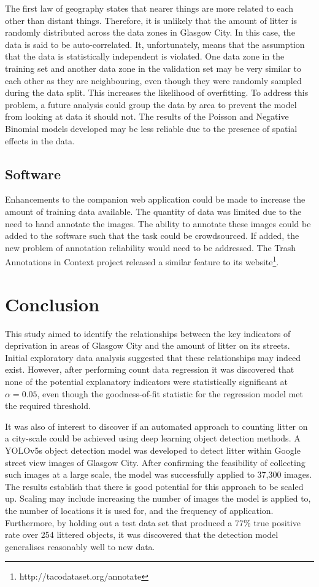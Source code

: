 \documentclass{thesis}
\begin{document}
The first law of geography states that nearer things are more related to each other than distant things\cite{law-geog-wikipedia}. Therefore, it is unlikely that the amount of litter is randomly distributed across the data zones in Glasgow City. In this case, the data is said to be auto-correlated. It, unfortunately, means that the assumption that the data is statistically independent is violated. One data zone in the training set and another data zone in the validation set may be very similar to each other as they are neighbouring, even though they were randomly sampled during the data split. This increases the likelihood of overfitting. To address this problem, a future analysis could group the data by area to prevent the model from looking at data it should not. The results of the Poisson and Negative Binomial models developed may be less reliable due to the presence of spatial effects in the data.

\subsection{Software}

Enhancements to the companion web application could be made to increase the amount of training data available. The quantity of data was limited due to the need to hand annotate the images. The ability to annotate these images could be added to the software such that the task could be crowdsourced. If added, the new problem of annotation reliability would need to be addressed. The Trash Annotations in Context project released a similar feature to its website\footnote{http://tacodataset.org/annotate}.

\section{Conclusion}

This study aimed to identify the relationships between the key indicators of deprivation in areas of Glasgow City and the amount of litter on its streets. Initial exploratory data analysis suggested that these relationships may indeed exist. However, after performing count data regression it was discovered that none of the potential explanatory indicators were statistically significant at $\alpha = 0.05$, even though the goodness-of-fit statistic for the regression model met the required threshold.

It was also of interest to discover if an automated approach to counting litter on a city-scale could be achieved using deep learning object detection methods. A YOLOv5s object detection model was developed to detect litter within Google street view images of Glasgow City. After confirming the feasibility of collecting such images at a large scale, the model was successfully applied to 37,300 images. The results establish that there is good potential for this approach to be scaled up. Scaling may include increasing the number of images the model is applied to, the number of locations it is used for, and the frequency of application. Furthermore, by holding out a test data set that produced a 77\% true positive rate over 254 littered objects, it was discovered that the detection model generalises reasonably well to new data.
\end{document}
